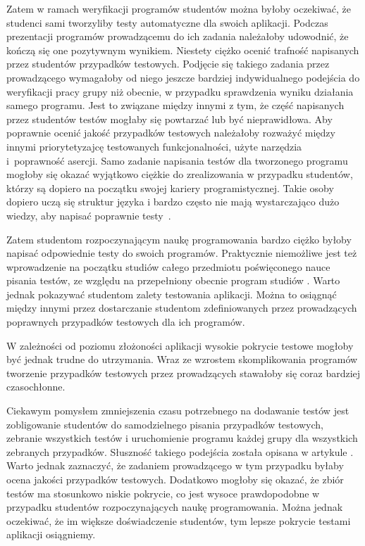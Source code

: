 Zatem w ramach weryfikacji programów studentów można byłoby oczekiwać, że studenci sami tworzyliby testy automatyczne dla swoich aplikacji.
Podczas prezentacji programów prowadzącemu do ich zadania należałoby udowodnić, że kończą się one pozytywnym wynikiem.
Niestety ciężko ocenić trafność napisanych przez studentów przypadków testowych.
Podjęcie się takiego zadania przez prowadzącego wymagałoby od niego jeszcze bardziej indywidualnego podejścia do weryfikacji pracy grupy niż obecnie, w przypadku sprawdzenia wyniku działania samego programu.
Jest to związane między innymi z tym, że część napisanych przez studentów testów mogłaby się powtarzać lub być nieprawidłowa.
Aby poprawnie ocenić jakość przypadków testowych należałoby rozważyć  między innymi priorytetyzajcę testowanych funkcjonalności, użyte narzędzia i~poprawność asercji.
Samo zadanie napisania testów dla tworzonego programu mogłoby się okazać wyjątkowo ciężkie do zrealizowania w przypadku studentów, którzy są dopiero na początku swojej kariery programistycznej.
Takie osoby dopiero uczą się struktur języka i bardzo często nie mają wystarczająco dużo wiedzy, aby napisać poprawnie testy~\cite{tests-and-begginers}.

Zatem studentom rozpoczynającym naukę programowania bardzo ciężko byłoby napisać odpowiednie testy do swoich programów.
Praktycznie niemożliwe jest też wprowadzenie na początku studiów całego przedmiotu poświęconego nauce pisania testów, ze względu na przepełniony obecnie program studiów \cite{overflow-studies-program}.
Warto jednak pokazywać studentom zalety testowania aplikacji.
Można to osiągnąć między innymi przez dostarczanie studentom zdefiniowanych przez prowadzących poprawnych przypadków testowych dla ich programów.

W zależności od poziomu złożoności aplikacji wysokie pokrycie testowe mogłoby być jednak trudne do utrzymania.
Wraz ze wzrostem skomplikowania programów tworzenie przypadków testowych przez prowadzących stawałoby się coraz bardziej czasochłonne.

Ciekawym pomysłem zmniejszenia czasu potrzebnego na dodawanie testów jest zobligowanie studentów do samodzielnego pisania przypadków testowych, zebranie wszystkich testów i uruchomienie programu każdej grupy dla wszystkich zebranych przypadków.
Słuszność takiego podejścia została opisana w artykule \cite{write-tests-by-students}.
Warto jednak zaznaczyć, że zadaniem prowadzącego w tym przypadku byłaby ocena jakości przypadków testowych.
Dodatkowo mogłoby się okazać, że zbiór testów ma stosunkowo niskie pokrycie, co jest wysoce prawdopodobne w przypadku studentów rozpoczynających naukę programowania.
Można jednak oczekiwać, że im większe doświadczenie studentów, tym lepsze pokrycie testami aplikacji osiągniemy.

